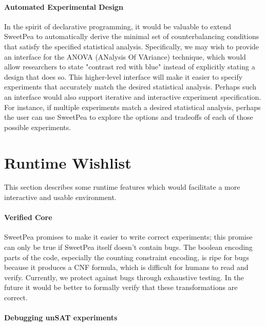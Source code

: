 \paragraph*{Automated Experimental Design}
In the spirit of declarative programming, it would be valuable to extend SweetPea to automatically derive the minimal set of counterbalancing conditions that satisfy the specified statistical analysis. Specifically, we may wish to provide an interface for the ANOVA (ANalysis Of VAriance) technique, which would allow researchers to state "contrast red with blue" instead of explicitly stating a design that does so. This higher-level interface will make it easier to specify experiments that accurately match the desired statistical analysis. Perhaps such an interface would also support iterative and interactive experiment specification. For instance, if multiple experiments match a desired statistical analysis, perhaps the user can use SweetPea to explore the options and tradeoffs of each of those possible experiments.



\section{Runtime Wishlist}

This section describes some runtime features which would facilitate a more interactive and usable environment.


\paragraph*{Verified Core}

SweetPea promises to make it easier to write correct experiments; this promise can only be true if SweetPea itself doesn't contain bugs. The boolean encoding parts of the code, especially the counting constraint encoding, is ripe for bugs because it produces a CNF formula, which is difficult for humans to read and verify. Currently, we protect against bugs through exhaustive testing. In the future it would be better to formally verify that these transformations are correct.

\paragraph*{Debugging unSAT experiments}

